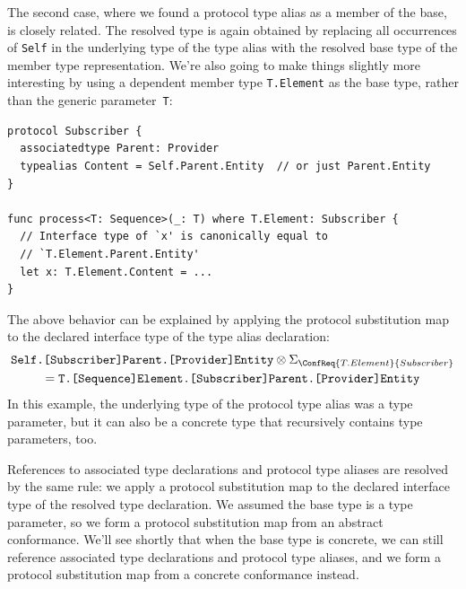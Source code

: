 \documentclass[../generics]{subfiles}
\begin{document}
The second case, where we found a protocol type alias as a member of the base, is closely related. The resolved type is again obtained by replacing all occurrences of \texttt{Self} in the underlying type of the type alias with the resolved base type of the member type representation. We're also going to make things slightly more interesting by using a dependent member type \texttt{T.Element} as the base type, rather than the generic parameter~\texttt{T}:
\begin{Verbatim}
protocol Subscriber {
  associatedtype Parent: Provider
  typealias Content = Self.Parent.Entity  // or just Parent.Entity
}

func process<T: Sequence>(_: T) where T.Element: Subscriber {
  // Interface type of `x' is canonically equal to
  // `T.Element.Parent.Entity'
  let x: T.Element.Content = ...
}
\end{Verbatim}
The above behavior can be explained by applying the protocol substitution map to the declared interface type of the type alias declaration:
\begin{multline*}
\texttt{Self.[Subscriber]Parent.[Provider]Entity}\otimes\Sigma_{\ConfReq{T.Element}{Subscriber}}\\
=\texttt{T.[Sequence]Element.[Subscriber]Parent.[Provider]Entity}
\end{multline*}
In this example, the underlying type of the protocol type alias was a type parameter, but it can also be a concrete type that recursively contains type parameters, too.

\smallskip

References to associated type declarations and protocol type aliases are resolved by the same rule: we apply a protocol substitution map to the declared interface type of the resolved type declaration. We assumed the base type is a type parameter, so we form a protocol substitution map from an abstract conformance. We'll see shortly that when the base type is concrete, we can still reference associated type declarations and protocol type aliases, and we form a protocol substitution map from a concrete conformance instead.
\end{document}
